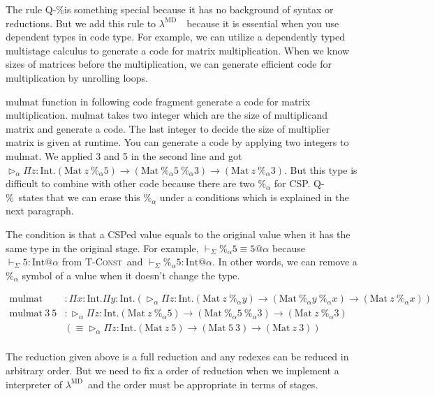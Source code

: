 \documentclass[runningheads]{llncs}
\newcommand{\LMD}{$\lambda^{\textrm{MD}}$\ }
\newcommand{\V}{\vdash_\Sigma}
\newcommand{\TW}{\triangleright}
\newcommand{\E}{\equiv}
\newcommand{\TConst}{\textsc{T-Const}}
\newcommand{\QPercent}{\textsc{Q-\%}}
\begin{document}
The rule \QPercent is something special because it has no background of syntax or reductions.
But we add this rule to \LMD\ because it is essential when you use dependent types in code type.
For example, we can utilize a dependently typed multistage calculus to generate a code for matrix multiplication.
When we know sizes of matrices before the multiplication,
we can generate efficient code for multiplication by unrolling loops.

\newcommand{\I}{\textrm{Int}}
\newcommand{\M}{\textrm{Mat}}

$\text{mulmat}$ function in following code fragment generate a code for matrix multiplication.
$\text{mulmat}$ takes two integer which are the size of multiplicand matrix and generate a code.
The last integer to decide the size of multiplier matrix is given at runtime.
You can generate a code by applying two integers to $\text{mulmat}$.
We applied 3 and 5 in the second line and got $\TW_\alpha \Pi z:\I.(\M\ z\ \%_\alpha 5) \to (\M\ \%_\alpha 5\ \%_\alpha 3) \to (\M\ z\ \%_\alpha 3)$.
But this type is difficult to combine with other code because there are two $\%_\alpha$ for CSP.
\QPercent\ states that we can erase this $\%_\alpha$ under a conditions which is explained in the next paragraph.

The condition is that a CSPed value equals to the original value when it has the same type in the original stage.
For example, $\V \%_\alpha 5 \E 5 @ \alpha$ because $ \V 5 : \I @ \alpha $ from \TConst\ and  $ \V \%_\alpha 5 : \I @ \alpha$.
In other words, we can remove a $\%_\alpha$ symbol of a value when it doesn't change the type.

{
\begin{align*}
	\text{mulmat}       & : \Pi x:\I.\Pi y:\I.(\TW_\alpha \Pi z:\I.(\M\ z\ \%_\alpha y) \to (\M\ \%_\alpha y\ \%_\alpha x) \to (\M\ z\ \%_\alpha x)) \\
	\text{mulmat}\ 3\ 5 & : \TW_\alpha \Pi z:\I.(\M\ z\ \%_\alpha 5) \to (\M\ \%_\alpha 5\ \%_\alpha 3) \to (\M\ z\ \%_\alpha 3)                     \\
	                    & (\E \TW_\alpha \Pi z:\I.(\M\ z\ 5) \to (\M\ 5\ 3) \to (\M\ z\ 3) )                                                         \\
\end{align*}
}

The reduction given above is a full reduction and any redexes can be reduced in arbitrary order.
But we need to fix a order of reduction when we implement a interpreter of \LMD and
the order must be appropriate in terms of stages.
\end{document}
